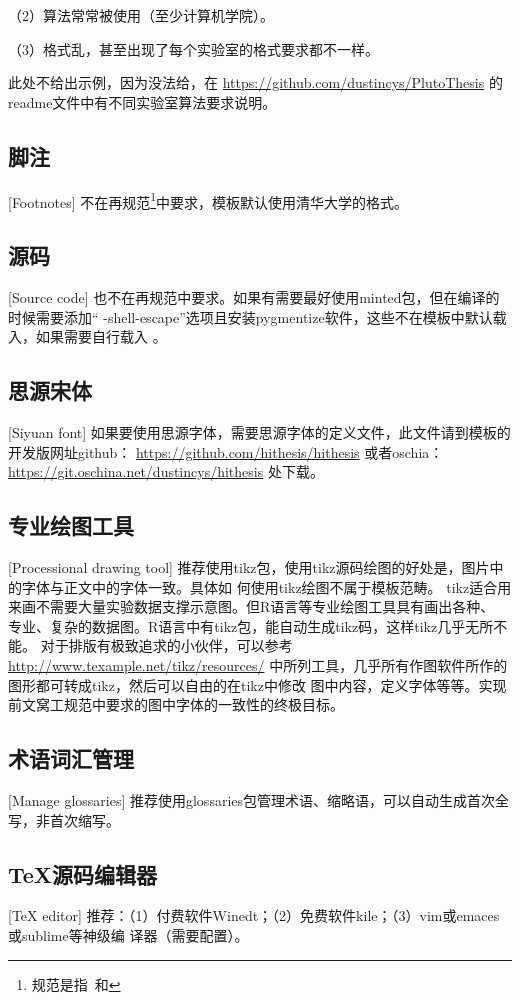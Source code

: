 （2）算法常常被使用（至少计算机学院）。

（3）格式乱，甚至出现了每个实验室的格式要求都不一样。

此处不给出示例，因为没法给，在
\url{https://github.com/dustincys/PlutoThesis}
的readme文件中有不同实验室算法要求说明。

\subsection{脚注}[Footnotes]
不在再规范\footnote{规范是指\PGR\ 和\UGR}中要求，模板默认使用清华大学的格式。

\subsection{源码}[Source code]
也不在再规范中要求。如果有需要最好使用minted包，但在编译的时候需要添加“
-shell-escape”选项且安装pygmentize软件，这些不在模板中默认载入，如果需要自行载入
。
\subsection{思源宋体}[Siyuan font]
如果要使用思源字体，需要思源字体的定义文件，此文件请到模板的开发版网址github：
\url{https://github.com/hithesis/hithesis}
或者oschia：
\url{https://git.oschina.net/dustincys/hithesis}
处下载。

\subsection{专业绘图工具}[Processional drawing tool]
\label{drawtool}
推荐使用tikz包，使用tikz源码绘图的好处是，图片中的字体与正文中的字体一致。具体如
何使用tikz绘图不属于模板范畴。
tikz适合用来画不需要大量实验数据支撑示意图。但R语言等专业绘图工具具有画出各种、
专业、复杂的数据图。R语言中有tikz包，能自动生成tikz码，这样tikz几乎无所不能。
对于排版有极致追求的小伙伴，可以参考
\url{http://www.texample.net/tikz/resources/}
中所列工具，几乎所有作图软件所作的图形都可转成tikz，然后可以自由的在tikz中修改
图中内容，定义字体等等。实现前文窝工规范中要求的图中字体的一致性的终极目标。


\subsection{术语词汇管理}[Manage glossaries]
推荐使用glossaries包管理术语、缩略语，可以自动生成首次全写，非首次缩写。

\subsection{\TeX{}源码编辑器}[\TeX{} editor]
推荐：（1）付费软件Winedt；（2）免费软件kile；（3）vim或emaces或sublime等神级编
译器（需要配置）。

